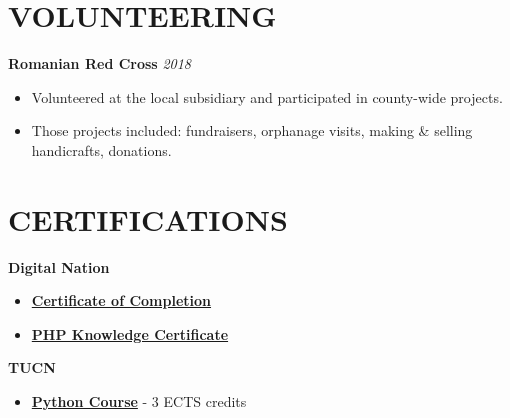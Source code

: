 \documentclass[margin]{res}
\begin{document}
\begin{resume}
  \section{VOLUNTEERING}
  \hspace{4mm}
  {\bf Romanian Red Cross} \hfill \textit{2018}
  \begin{itemize}
    \item Volunteered at the local subsidiary and participated in county-wide projects.
    \item Those projects included: fundraisers, orphanage visits, making \& selling handicrafts, donations.
  \end{itemize}

  \section{CERTIFICATIONS}
  \hspace{4mm}
  {\bf Digital Nation}
  \begin{itemize}
    \item \href{https://drive.google.com/file/d/15JN-Ko_CXP_WKGsrRxdQNzniaNkSrgTx/view}{\textbf{Certificate of Completion}}
    \item \href{https://drive.google.com/file/d/1Ahga9TNBsfRH_j3DBIsywD5D3XRbzElf/view}{\textbf{PHP Knowledge Certificate}}
  \end{itemize}
  \hspace{4mm}
  {\bf TUCN}
  \begin{itemize}
    \item \href{https://drive.google.com/file/d/1-IKzgJgB8cK2fZ3cvvYGLBRQKGds8YUM/view}{\textbf{Python Course}} - 3 ECTS credits
  \end{itemize}
\end{resume}
\end{document}

